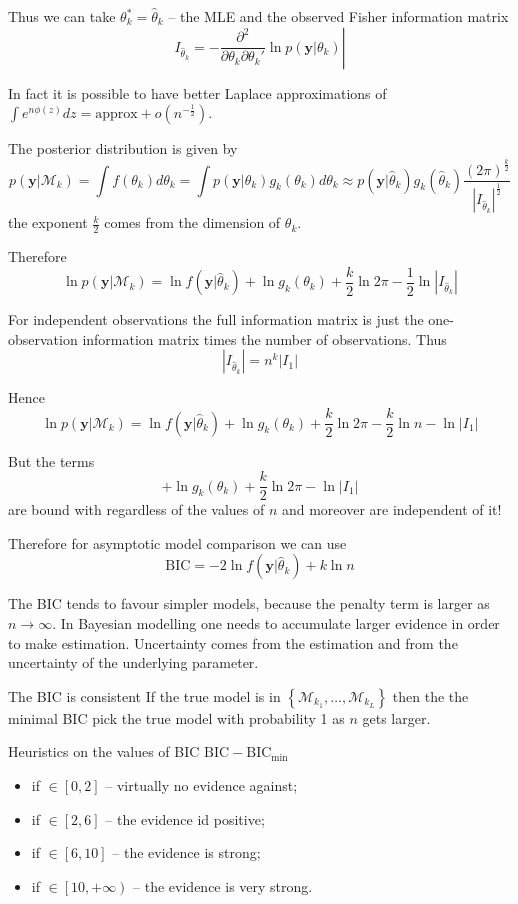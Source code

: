 \documentclass[a4paper]{article}
\newcommand{\obj}[1]{{\left\{ #1 \right \}}}
\newcommand{\clo}[1]{{\left [ #1 \right ]}}
\newcommand{\clop}[1]{{\left [ #1 \right )}}
\newcommand{\brac}[1]{{\left ( #1 \right )}}
\newcommand{\induc}[1]{{\left . #1 \right \vert}}
\newcommand{\abs}[1]{{\left | #1 \right |}}
\newcommand{\Mcal}{\mathcal{M}}
\begin{document}
Thus we can take $\theta_k^* = \hat{\theta}_k$ -- the MLE and the observed Fisher information matrix
\[I_{\hat{\theta}_k} = \induc{- \frac{\partial^2}{\partial\theta_k \partial\theta_k'}\ln p\brac{\induc{\mathbf{y}} \theta_k}} \]

In fact it is possible to have better Laplace approximations of $\int e^{n\phi(z)}dz = \text{approx} + o(n^{-\frac{1}{2}})$.

The posterior distribution is given by 
\[p\brac{\induc{\mathbf{y}}\Mcal_k} = \int f(\theta_k) d \theta_k = \int p\brac{\induc{\mathbf{y}}\theta_k} g_k(\theta_k) d \theta_k \approx p\brac{\induc{\mathbf{y}}\hat{\theta}_k} g_k(\hat{\theta}_k) \frac{\brac{2\pi}^\frac{k}{2}}{\abs{I_{\hat{\theta}_k}}^\frac{1}{2}}\]
the exponent $\frac{k}{2}$ comes from the dimension of $\theta_k$.

Therefore
\[\ln p\brac{\induc{\mathbf{y}}\Mcal_k} = \ln f\brac{\induc{\mathbf{y}}\hat{\theta}_k} + \ln g_k(\theta_k) + \frac{k}{2} \ln 2 \pi - \frac{1}{2}\ln \abs{I_{\hat{\theta}_k}} \]

For independent observations the full information matrix is just the one-observation information matrix times the number of observations.
Thus 
\[\abs{I_{\hat{\theta}_k}} = n^k \abs{I_1}\]

Hence 
\[\ln p\brac{\induc{\mathbf{y}}\Mcal_k} = \ln f\brac{\induc{\mathbf{y}}\hat{\theta}_k} + \ln g_k(\theta_k) + \frac{k}{2} \ln 2 \pi - \frac{k}{2}\ln n - \ln \abs{I_1} \]

But the terms 
\[ + \ln g_k(\theta_k) + \frac{k}{2} \ln 2 \pi - \ln \abs{I_1}\]
are bound with regardless of the values of $n$ and moreover are independent of it!

Therefore for asymptotic model comparison we can use
\[\text{BIC} = -2\ln f\brac{\induc{\mathbf{y}}\hat{\theta}_k} + k\ln n \]

The BIC tends to favour simpler models, because the penalty term is larger as $n\to \infty$.
In Bayesian modelling one needs to accumulate larger evidence in order to make estimation.
Uncertainty comes from the estimation and from the uncertainty of the underlying parameter.


The BIC is consistent
If the true model is in $\obj{\Mcal_{k_1},\ldots,\Mcal_{k_L}}$ then the the minimal BIC pick the true model with probability 1 as $n$ gets larger.

Heuristics on the values of BIC $\text{BIC}-\text{BIC}_{\min}$
\begin{itemize}
	\item if $\in\clo{0,2}$ -- virtually no evidence against;
	\item if $\in\clo{2,6}$ -- the evidence id positive;
	\item if $\in\clo{6,10}$ -- the evidence is strong;
	\item if $\in\clop{10, +\infty}$ -- the evidence is very strong.
\end{itemize}
\end{document}
